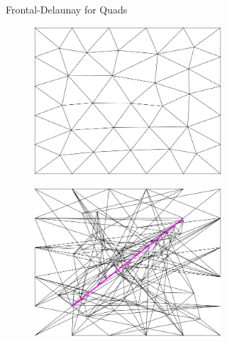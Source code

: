 \begin{figure}[p]
\begin{subfigure}[b]{\textwidth}
\begin{subfigure}[b]{0.33\textwidth}
        \end{subfigure}
        \caption{Frontal-Delaunay for Quads}
        \label{fig:Gmsh-Frontal-Quads}
    \end{subfigure}
    \begin{subfigure}[b]{\textwidth}
        \centering
        \begin{subfigure}[b]{0.33\textwidth}
            \centering
            \includegraphics[width=\textwidth]{report/Images/Software/Gmsh meshing algorithms/gmsh_meshing_algorithms_bamg.png}
        \end{subfigure}
        \begin{subfigure}[b]{0.33\textwidth}
            \centering
            \includegraphics[width=\textwidth]{report/Images/Software/Gmsh meshing algorithms/gmsh_meshing_algorithms_embedded_bamg.png}

\end{subfigure}
\end{subfigure}
\end{figure}
